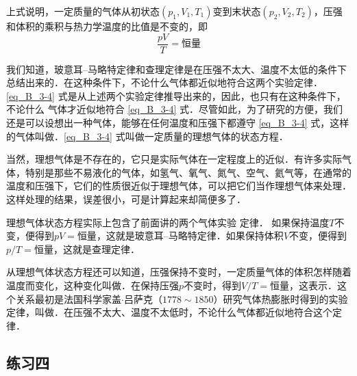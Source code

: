 上式说明，一定质量的气体从初状态$(p_1,V_1,T_1)$变到末状态$(p_2,V_2,T_2)$，压强和体积的乘积与热力学温度的比值是不变的，即
\begin{equation}\label{eq_B_3-4}
\frac{pV}{T}=\text{恒量}
\end{equation}

我们知道，玻意耳--马略特定律和查理定律是在压强不太大、温度不太低的条件下总结出来的．在这种条件下，不论什么气体都近似地符合这两个实验定律．\eqref{eq_B_3-4} 式是从上述两个实验定律推导出来的，因此，也只有在这种条件下，不论什么
气体才近似地符合 \eqref{eq_B_3-4} 式．尽管如此，为了研究的方便，我们还是可以设想出一种气体，能够在任何温度和压强下都遵守 \eqref{eq_B_3-4}  式，这样的气体叫做．\eqref{eq_B_3-4} 式叫做一定质量的理想气体的状态方程．

当然，理想气体是不存在的，它只是实际气体在一定程度上的近似．有许多实际气体，特别是那些不易液化的气体，如氢气、氧气、氮气、空气、氦气等，在通常的温度和压强下，它们的性质很近似于理想气体，可以把它们当作理想气体来处理．这样处理的结果，误差很小，可是计算起来却简便多了．

理想气体状态方程实际上包含了前面讲的两个气体实验
定律．
如果保持温度$T$不变，便得到$pV=\text{恒量}$，这就是玻意耳--马略特定律．如果保持体积$V$不变，便得到$p/T=\text{恒量}$，这就是查理定律．

从理想气体状态方程还可以知道，压强保持不变时，一定质量气体的体积怎样随着温度而变化，这种变化叫做．在保持压强$p$不变时，得到$V/T=\text{恒量}$，这表示．这个关系最初是法国科学家盖$\cdot$吕萨克（$1778 \sim 1850$）研究气体热膨胀时得到的实验定律，叫做．在压强不太大、温度不太低时，不论什么气体都近似地符合这个定律．


\subsection*{练习四}

